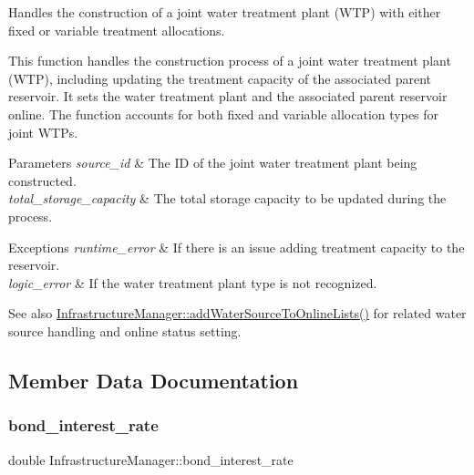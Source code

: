 Handles the construction of a joint water treatment plant (W\+TP) with either fixed or variable treatment allocations. 

This function handles the construction process of a joint water treatment plant (W\+TP), including updating the treatment capacity of the associated parent reservoir. It sets the water treatment plant and the associated parent reservoir online. The function accounts for both fixed and variable allocation types for joint W\+T\+Ps.


\begin{DoxyParams}{Parameters}
{\em source\+\_\+id} & The ID of the joint water treatment plant being constructed. \\
\hline
{\em total\+\_\+storage\+\_\+capacity} & The total storage capacity to be updated during the process.\\
\hline
\end{DoxyParams}

\begin{DoxyExceptions}{Exceptions}
{\em runtime\+\_\+error} & If there is an issue adding treatment capacity to the reservoir. \\
\hline
{\em logic\+\_\+error} & If the water treatment plant type is not recognized.\\
\hline
\end{DoxyExceptions}
\begin{DoxySeeAlso}{See also}
\mbox{\hyperlink{classInfrastructureManager_ab66bdc91a6f60c6aea6ce0bf179df913}{Infrastructure\+Manager\+::add\+Water\+Source\+To\+Online\+Lists()}} for related water source handling and online status setting. 
\end{DoxySeeAlso}


\subsection{Member Data Documentation}
\mbox{\label{classInfrastructureManager_ab8ddaa0ed220e29bc296470b7a905a3b}} 
\subsubsection{\texorpdfstring{bond\+\_\+interest\+\_\+rate}{bond\_interest\_rate}}
{\footnotesize\ttfamily double Infrastructure\+Manager\+::bond\+\_\+interest\+\_\+rate\hspace{0.3cm}{\ttfamily [private]}}



